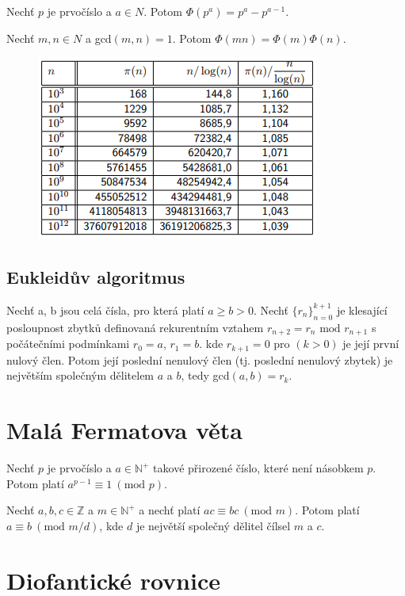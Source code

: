 \documentclass{szzclass}
\begin{document}
Nechť $p$ je prvočíslo a $a \in N$. Potom $\Phi(p^a) = p^a - p^{a-1}$.

Nechť $m, n \in N$ a gcd$(m, n) = 1$. Potom $\Phi(mn) = \Phi(m)\Phi(n)$.



\begin{figure}[!h]
\includegraphics[width=.75\textwidth, center]{topics/bi-spol-33/images/primes.png}
\end{figure}


\subsection{Eukleidův algoritmus}
Nechť a, b jsou celá čísla, pro která platí
$a \geq b > 0$. Nechť $\{r_n\}^{k+1}_{n=0}$ je klesající posloupnost zbytků definovaná
rekurentním vztahem $r_{n+2} = r_n\text{ mod }r_{n+1}$ s počátečními podmínkami $r_0 = a$, $r_1 = b$.
kde $r_{k+1} = 0$ pro $(k > 0)$ je její první nulový člen. Potom její poslední
nenulový člen (tj. poslední nenulový zbytek) je největším společným
dělitelem $a$ a $b$, tedy gcd$ (a, b) = r_k$.

\newpage

\section{Malá Fermatova věta}

Nechť $p$ je prvočíslo a $a \in \mathbb{N}^+$ takové přirozené
číslo, které není násobkem $p$. Potom platí $a^{p-1} \equiv 1~(\text{mod }p)$.

Nechť $a, b, c \in \mathbb{Z}$ a $m \in \mathbb{N}^+$ a nechť platí $ac \equiv bc~(\text{mod } m)$. Potom platí
$a \equiv b~(\text{mod } m/d)$, kde $d$ je největší společný dělitel čílsel $m$ a $c$.


\section{Diofantické rovnice}
\end{document}
